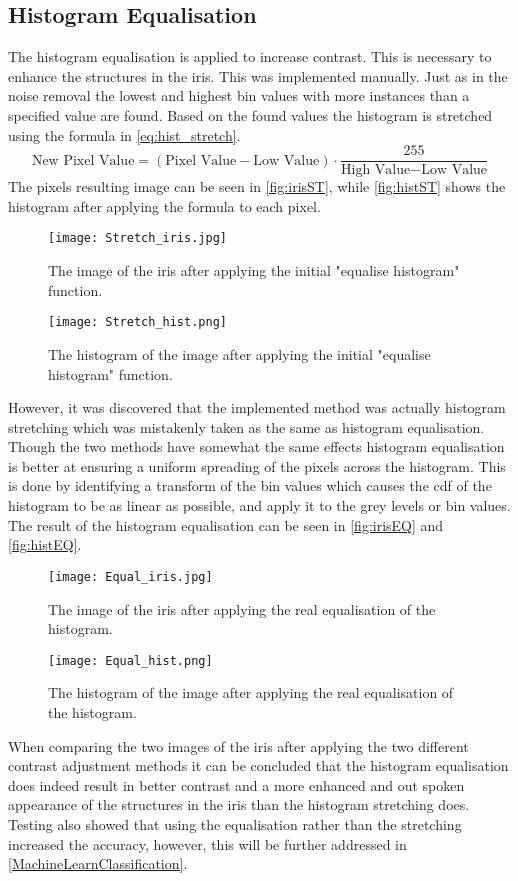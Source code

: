 \subsection{Histogram Equalisation}
The histogram equalisation is applied to increase contrast. This is necessary to enhance the structures in the iris. This was implemented manually. Just as in the noise removal the lowest and highest bin values with more instances than a specified value are found. Based on the found values the histogram is stretched using the formula in \autoref{eq:hist_stretch}.
\begin{equation}\label{eq:hist_stretch}
	\text{New~Pixel~Value}=(\text{Pixel~Value}-\text{Low~Value})\cdot\frac{255}{\text{High~Value}-\text{Low~Value}}
\end{equation}
The pixels  resulting image can be seen in \autoref{fig:irisST}, while \autoref{fig:histST} shows the histogram after applying the formula to each pixel.
\begin{figure}[h]
\centering
\texttt{[image: Stretch\_iris.jpg]}
\caption{The image of the iris after applying the initial "equalise histogram" function.}
\label{fig:irisST}
\end{figure}
\begin{figure}[h]
\centering
\texttt{[image: Stretch\_hist.png]}
\caption{The histogram of the image after applying the initial "equalise histogram" function.}
\label{fig:histST}
\end{figure}
However, it was discovered that the implemented method was actually histogram stretching which was mistakenly taken as the same as histogram equalisation. Though the two methods have somewhat the same effects histogram equalisation is better at ensuring a uniform spreading of the pixels across the histogram. 
This is done by identifying a transform of the bin values which causes the \gls{cdf} of the histogram to be as linear as possible, and apply it to the grey levels or bin values. The result of the histogram equalisation can be seen in \autoref{fig:irisEQ} and \autoref{fig:histEQ}.
\begin{figure}[h]
\centering
\texttt{[image: Equal\_iris.jpg]}
\caption{The image of the iris after applying the real equalisation of the histogram.}
\label{fig:irisEQ}
\end{figure}
\begin{figure}[h]
\centering
\texttt{[image: Equal\_hist.png]}
\caption{The histogram of the image after applying the real equalisation of the histogram.}
\label{fig:histEQ}
\end{figure}
When comparing the two images of the iris after applying the two different contrast adjustment methods it can be concluded that the histogram equalisation does indeed result in better contrast and a more enhanced and out spoken appearance of the structures in the iris than the histogram stretching does. Testing also showed that using the equalisation rather than the stretching increased the accuracy, however, this will be further addressed in \autoref{MachineLearnClassification}. 


